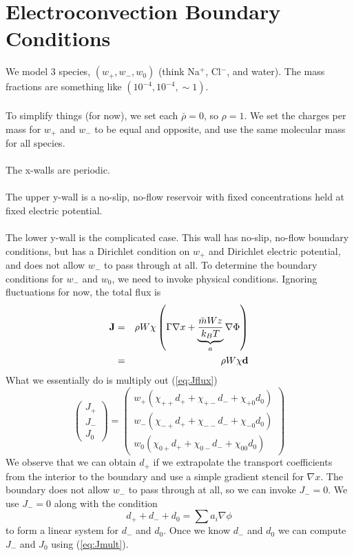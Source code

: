 \documentclass[final]{siamltex}
\begin{document}
\section{Electroconvection Boundary Conditions}

We model 3 species, $(w_+, w_-, w_0)$ (think Na$^+$, Cl$^-$, and water).
The mass fractions are something like $(10^{-4}, 10^{-4}, \sim 1)$.\\ \\

To simplify things (for now), we set each $\bar\rho=0$, so $\rho=1$.
We set the charges per mass for $w_+$ and $w_-$ to be equal and
opposite, and use the same molecular mass for all species.\\ \\

The x-walls are periodic.\\ \\

The upper y-wall is a no-slip, no-flow reservoir with fixed concentrations
held at fixed electric potential.\\ \\

The lower y-wall is the complicated case.  This wall 
has no-slip, no-flow boundary conditions, but has a Dirichlet condition
on $w_+$ and Dirichlet electric potential, and does not allow $w_-$ to
pass through at all.
To determine the boundary conditions for $w_-$ and $w_0$,
we need to invoke physical conditions.  Ignoring fluctuations for now,
the total flux is
\begin{eqnarray}
\bf{J} &=& \rho W \chi \left( \Gamma \nabla x + \underbrace{\frac{\bar{m} W z}{k_B T}}_{a}\nabla \Phi \right) \nonumber\\
&=& \rho W \chi {\bf d}\label{eq:Jflux}
\end{eqnarray}
What we essentially do is multiply out (\ref{eq:Jflux})
\begin{equation}
\left(\begin{array}{c}
J_+ \\
J_- \\
J_0
\end{array}\right)
=
\left(\begin{array}{ccc}
w_+(\chi_{++}d_+ + \chi_{+-}d_- + \chi_{+0}d_0) \\
w_-(\chi_{-+}d_+ + \chi_{--}d_- + \chi_{-0}d_0) \\
w_0(\chi_{0+}d_+ + \chi_{0-}d_- + \chi_{00}d_0)
\end{array}\right)\label{eq:Jmult}
\end{equation}
We observe that we can obtain $d_+$ if we extrapolate the transport coefficients from
the interior to the boundary and use a simple gradient stencil for $\nabla x$.
The boundary does not allow $w_-$ to pass through at all, so we can invoke $J_-=0$.
We use $J_-=0$ along with the condition
\begin{equation}
d_+ + d_- + d_0 = \sum a_i \nabla\phi
\end{equation}
to form a linear system for $d_-$ and $d_0$.
Once we know $d_-$ and $d_0$ we can compute $J_-$ and $J_0$ using (\ref{eq:Jmult}).



\end{document}
